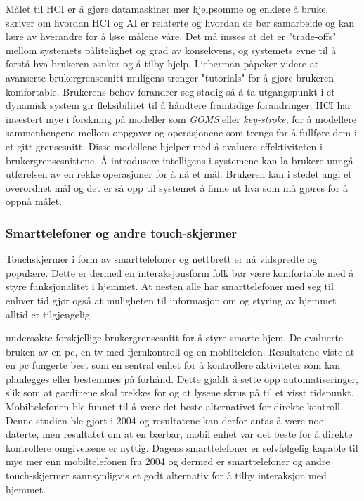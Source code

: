 Målet til HCI er å gjøre datamaskiner mer hjelpsomme og enklere å bruke. \citet{Lieberman09} skriver om hvordan HCI og AI er relaterte og hvordan de bør samarbeide og kan lære av hverandre for å løse målene våre. Det må insses at det er "trade-offs" mellom systemets pålitelighet og grad av konsekvens, og systemets evne til å forstå hva brukeren øsnker og å tilby hjelp. Lieberman påpeker videre at avanserte brukergrensesnitt muligens trenger "tutorials" for å gjøre brukeren komfortable. Brukerens behov forandrer seg stadig så å ta utgangspunkt i et dynamisk system gir fleksibilitet til å håndtere framtidige forandringer. HCI har investert mye i forskning på modeller som \emph{GOMS} eller \emph{key-stroke}, for å modellere sammenhengene mellom oppgaver og operasjonene som trengs for å fullføre dem i et gitt grensesnitt. Disse modellene hjelper med å evaluere effektiviteten i brukergrensesnittene. Å introdusere intelligens i systemene kan la brukere unngå utførelsen av en rekke operasjoner for å nå et mål. Brukeren kan i stedet angi et overordnet mål og det er så opp til systemet å finne ut hva som må gjøres for å oppnå målet.

\subsubsection*{Smarttelefoner og andre touch-skjermer}
Touchskjermer i form av smarttelefoner og nettbrett er nå vidspredte og populære. Dette er dermed en interaksjonsform folk bør være komfortable med å styre funksjonalitet i hjemmet. At nesten alle har smarttelefoner med seg til enhver tid gjør også at muligheten til informasjon om og styring av hjemmet alltid er tilgjengelig.

\citet{koskela04} undersøkte forskjellige brukergrensesnitt for å styre smarte hjem. De evaluerte bruken av en pc, en tv med fjernkontroll og en mobiltelefon. Resultatene viste at en pc fungerte best som en sentral enhet for å kontrollere aktiviteter som kan planlegges eller bestemmes på forhånd. Dette gjaldt å sette opp automatiseringer, slik som at gardinene skal trekkes for og at lysene skrus på til et visst tidspunkt. Mobiltelefonen ble funnet til å være det beste alternativet for direkte kontroll. Denne studien ble gjort i 2004 og resultatene kan derfor antas å være noe daterte, men resultatet om at en bærbar, mobil enhet var det beste for å direkte kontrollere omgivelsene er nyttig. Dagens smarttelefoner er selvfølgelig kapable til mye mer enn mobiltelefonen fra 2004 og dermed er smarttelefoner og andre touch-skjermer sannsynligvis et godt alternativ for å tilby interaksjon med hjemmet.

